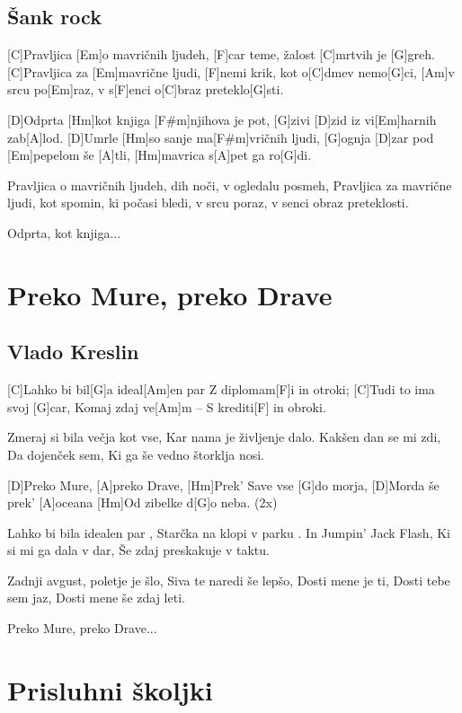 \documentclass[a4paper,12pt]{article}
\begin{document}
\begin{multicols}{2}
\subsection*{Šank rock}
\begin{guitar}
[Am G F G Am] 


[C]Pravljica [Em]o mavričnih ljudeh, 
[F]car teme, žalost [C]mrtvih je [G]greh.
[C]Pravljica za [Em]mavrične ljudi, 
[F]nemi krik, kot o[C]dmev nemo[G]ci, 
[Am]v srcu po[Em]raz, v s[F]enci o[C]braz preteklo[G]sti. 


[D]Odprta [Hm]kot knjiga [F#m]njihova je pot,
[G]zivi [D]zid iz vi[Em]harnih zab[A]lod.
[D]Umrle [Hm]so sanje ma[F#m]vričnih ljudi,
[G]ognja [D]zar pod [Em]pepelom še [A]tli,
[Hm]mavrica s[A]pet ga ro[G]di. 


Pravljica o mavričnih ljudeh, 
dih noči, v ogledalu posmeh, 
Pravljica za mavrične ljudi, 
kot spomin, ki počasi bledi, 
v srcu poraz, v senci obraz preteklosti. 


Odprta, kot knjiga...

\end{guitar}
\section{Preko Mure, preko Drave}
\subsection*{Vlado Kreslin}
\begin{guitar}

[C]Lahko bi bil[G]a ideal[Am]en par 
Z diplomam[F]i in otroki;
[C]Tudi to ima svoj [G]car, 
Komaj zdaj ve[Am]m – 
S krediti[F] in obroki. 


Zmeraj si bila večja kot vse, 
Kar nama je življenje dalo. 
Kakšen dan se mi zdi, 
Da dojenček sem, 
Ki ga še vedno štorklja nosi. 


[D]Preko Mure, [A]preko Drave,
[Hm]Prek' Save vse [G]do morja,
[D]Morda še prek' [A]oceana
[Hm]Od zibelke d[G]o neba. (2x) 


Lahko bi bila idealen par ,
Starčka na klopi v parku .
In Jumpin' Jack Flash, 
Ki si mi ga dala v dar, 
Še zdaj preskakuje v taktu.


Zadnji avgust, poletje je šlo, 
Siva te naredi še lepšo, 
Dosti mene je ti, 
Dosti tebe sem jaz, 
Dosti mene še zdaj leti. 


Preko Mure, preko Drave...

\end{guitar}
\section{Prisluhni školjki}

\end{multicols}
\end{document}
